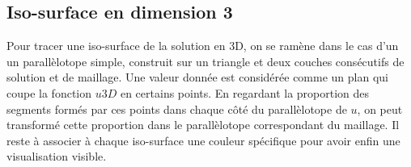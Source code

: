 \documentclass{book}
\begin{document}
\subsection{Iso-surface en dimension 3}
Pour tracer une iso-surface de la solution en 3D, on se ramène dans le cas d'un un parallèlotope simple, construit sur un triangle et deux couches consécutifs de solution et de maillage. Une valeur donnée est considérée comme un plan qui coupe la fonction $u3D$ en certains points. En regardant la proportion des segments formés par ces points dans chaque côté du parallèlotope de $u$, on peut transformé cette proportion dans le parallèlotope correspondant du maillage. Il reste à associer à chaque iso-surface une couleur spécifique pour avoir enfin une visualisation visible. 
\end{document}

